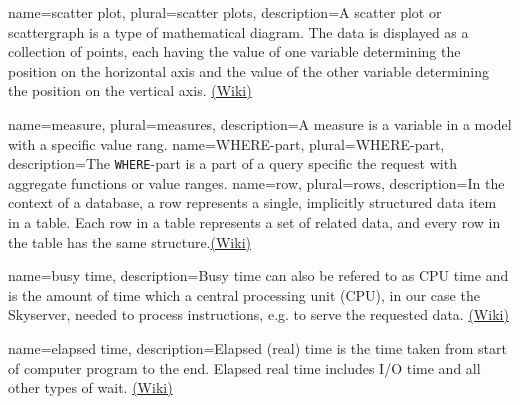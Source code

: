 {
  name=scatter plot,
  plural=scatter plots,
  description={A scatter plot or scattergraph is a type of mathematical diagram. 
  The data is displayed as a collection of points, each having the value of one 
  variable determining the position on the horizontal axis and the value of the other 
  variable determining the position on the vertical axis. \href{http://en.wikipedia.org/wiki/Scatter_plot}{(Wiki)}}
}

{
  name=measure,
  plural=measures,
  description={A measure is a variable in a model with a specific value rang.}
}
{
  name=WHERE-part,
  plural=WHERE-part,
  description={The \texttt{WHERE}-part is a part of a \gls{query} specific the request with
   aggregate functions or value ranges.}
}
{
  name=row,
  plural=rows,
  description={In the context of a database, a row represents a single, implicitly 
  structured data item in a table. Each row in a table represents a set of related data, 
  and every row in the table has the same structure.\href{(http://en.wikipedia.org/wiki/Row_(database))}{(Wiki)}}
}

{
  name=busy time,
  description={Busy time can also be refered to as CPU time and is the amount of time which a 
  central processing unit (CPU), in our case the Skyserver, needed to process instructions,
   e.g. to serve the requested data. \href{(http://en.wikipedia.org/wiki/CPU_time)}{(Wiki)}}
}

{
  name=elapsed time,
  description={Elapsed (real) time is the time taken from start of computer program to the end. 
  Elapsed real time includes I/O time and all other types of wait. 
  \href{(http://en.wikipedia.org/wiki/Elapsed_real_time)}{(Wiki)}}
}